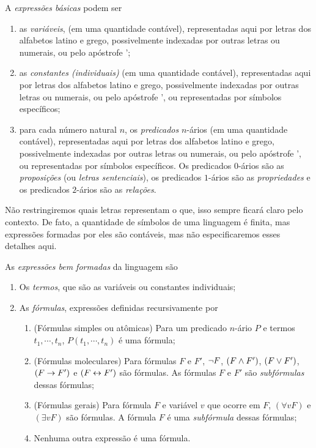 A \emph{expressões básicas} podem ser
	\begin{enumerate}
	\item as \emph{variáveis}, (em uma quantidade contável), representadas aqui por letras dos alfabetos latino e grego, possivelmente indexadas por outras letras ou numerais, ou pelo apóstrofe ';
	
	\item as \emph{constantes (individuais)} (em uma quantidade contável), representadas aqui por letras dos alfabetos latino e grego, possivelmente indexadas por outras letras ou numerais, ou pelo apóstrofe ', ou representadas por símbolos específicos;
	
	\item para cada número natural $n$, os \emph{predicados} $n$-ários (em uma quantidade contável), representadas aqui por letras dos alfabetos latino e grego, possivelmente indexadas por outras letras ou numerais, ou pelo apóstrofe ', ou representadas por símbolos específicos. Os predicados $0$-ários são as \emph{proposições} (ou \emph{letras sentenciais}), os predicados $1$-ários são as \emph{propriedades} e os predicados $2$-ários são as \emph{relações}.
	\end{enumerate}

Não restringiremos quais letras representam o que, isso sempre ficará claro pelo contexto. De fato, a quantidade de símbolos de uma linguagem é finita, mas expressões formadas por eles são contáveis, mas não especificaremos esses detalhes aqui.

As \emph{expressões bem formadas} da linguagem são
	\begin{enumerate}
	\item Os \emph{termos}, que são as variáveis ou constantes individuais;
	
	\item As \emph{fórmulas}, expressões definidas recursivamente por
		\begin{enumerate}
		\item (Fórmulas simples ou atômicas) Para um predicado $n$-ário $P$ e termos $t_1, \cdots, t_n$, $P(t_1,\cdots,t_n)$ é uma fórmula;
		
		\item (Fórmulas moleculares) Para fórmulas $F$ e $F'$, $\lnot F$, $(F \land F')$, $(F \lor F')$, $(F \rightarrow F')$ e $(F \leftrightarrow F')$ são fórmulas. As fórmulas $F$ e $F'$ são \emph{subfórmulas} dessas fórmulas;
		
		\item (Fórmulas gerais) Para fórmula $F$ e variável $v$ que ocorre em $F$, $(\forall v F)$ e $(\exists v F)$ são fórmulas. A fórmula $F$ é uma \emph{subfórmula} dessas fórmulas;
		
		\item Nenhuma outra expressão é uma fórmula.
		\end{enumerate}
	\end{enumerate}

